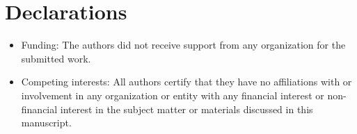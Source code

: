 \documentclass[pdflatex,sn-mathphys-num]{sn-jnl}%
\theoremstyle{thmstyleone}%
\theoremstyle{thmstyletwo}%
\theoremstyle{thmstylethree}%
\begin{document}

\backmatter

\section*{Declarations}

\begin{itemize}
\item Funding: The authors did not receive support from any organization for the submitted work.
\item Competing interests:  All authors certify that they have no affiliations with or involvement in any organization or entity with any financial interest or non-financial interest in the subject matter or materials discussed in this manuscript.
\end{itemize}

\end{document}
